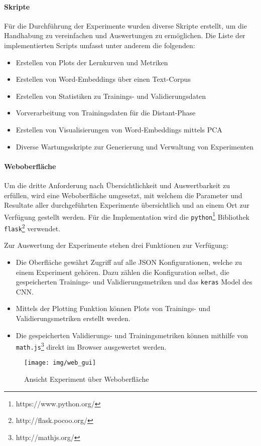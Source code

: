 \paragraph{Skripte}
\label{technical_setup:scripts}
Für die Durchführung der Experimente wurden diverse Skripte erstellt, um die Handhabung zu vereinfachen und Auswertungen zu ermöglichen. Die Liste der implementierten Scripts umfasst unter anderem die folgenden:

\begin{itemize}[noitemsep]
	\item Erstellen von Plots der Lernkurven und Metriken
	\item Erstellen von Word-Embeddings über einen Text-Corpus
	\item Erstellen von Statistiken zu Trainings- und Validierungsdaten
	\item Vorverarbeitung von Trainingsdaten für die Distant-Phase
	\item Erstellen von Visualisierungen von Word-Embeddings mittels PCA
	\item Diverse Wartungsskripte zur Generierung und Verwaltung von Experimenten
\end{itemize}

\paragraph{Weboberfläche}
\label{technical_setup:webgui}
Um die dritte Anforderung nach Übersichtlichkeit und Auswertbarkeit zu erfüllen, wird eine Weboberfläche umgesetzt, mit welchem die Parameter und Resultate aller durchgeführten Experimente übersichtlich und an einem Ort zur Verfügung gestellt werden. Für die Implementation wird die \texttt{python}\footnote{https://www.python.org/} Bibliothek \texttt{flask}\footnote{http://flask.pocoo.org/} verwendet.

Zur Auswertung der Experimente stehen drei Funktionen zur Verfügung:
\begin{itemize}
	\item Die Oberfläche gewährt Zugriff auf alle JSON Konfigurationen, welche zu einem Experiment gehören. Dazu zählen die Konfiguration selbst, die gespeicherten Trainings- und Validierungsmetriken und das \texttt{keras} Model des CNN.
	\item Mittels der Plotting Funktion können Plots von Trainings- und Validierungsmetriken erstellt werden.
	\item Die gespeicherten Validierungs- und Trainingsmetriken können mithilfe von \texttt{math.js}\footnote{http://mathjs.org/} direkt im Browser ausgewertet werden.
\end{itemize}
\begin{figure}[H]
	\centering
	\texttt{[image: img/web\_gui]}
	\caption{Ansicht Experiment über Weboberfläche}
	\label{fig:web_gui}
\end{figure}

